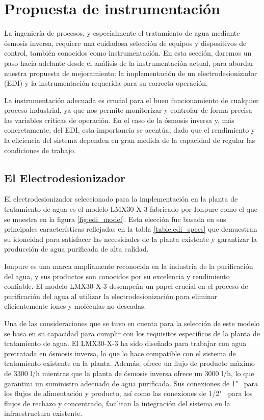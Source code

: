 \section{Propuesta de instrumentación}

La ingeniería de procesos, y especialmente el tratamiento de agua mediante ósmosis inversa, requiere una cuidadosa selección de equipos y dispositivos de control, también conocidos como instrumentación. En esta sección, daremos un paso hacia adelante desde el análisis de la instrumentación actual, para abordar nuestra propuesta de mejoramiento: la implementación de un electrodesionizador (EDI) y la instrumentación requerida para su correcta operación.

La instrumentación adecuada es crucial para el buen funcionamiento de cualquier proceso industrial, ya que nos permite monitorizar y controlar de forma precisa las variables críticas de operación. En el caso de la ósmosis inversa y, más concretamente, del EDI, esta importancia se acentúa, dado que el rendimiento y la eficiencia del sistema dependen en gran medida de la capacidad de regular las condiciones de trabajo.

\subsection{El Electrodesionizador}

El electrodesionizador seleccionado para la implementación en la planta de tratamiento
de agua es el modelo LMX30-X-3 fabricado por Ionpure como el que se muestra en la
figura \ref{fig:edi_model}. Esta elección fue basada en sus principales características
reflejadas en la tabla \ref{table:edi_specs} que
demuestran su idoneidad para satisfacer las necesidades de la planta existente y
garantizar la producción de agua purificada de alta calidad.


Ionpure es una marca ampliamente reconocida en la industria de la purificación del agua,
y sus productos son conocidos por su excelencia y rendimiento confiable.
El modelo LMX30-X-3 desempeña un papel crucial en el proceso de purificación
del agua al utilizar la electrodesionización para eliminar eficientemente iones y
moléculas no deseadas.

Una de las consideraciones que se tuvo en cuenta para la selección de este modelo
se basa en su capacidad para cumplir con los
requisitos específicos de la planta de tratamiento de agua. El LMX30-X-3 ha
sido diseñado para trabajar con agua pretratada en ósmosis inversa, lo que lo
hace compatible con el sistema de tratamiento existente en la planta. Además,
ofrece un flujo de producto máximo de 3300 l/h mientras que la
planta de ósmosis inversa ofrece un 3000 l/h, lo que garantiza un suministro
adecuado de agua purificada.
Sus conexiones de 1" \ para los flujos de alimentación y producto, así como las
conexiones de 1/2" \ para los flujos de rechazo y concentrado, facilitan la
integración del sistema en la infraestructura existente.

